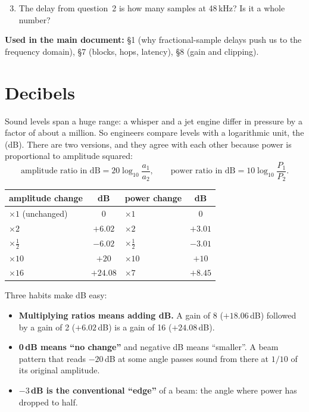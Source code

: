 \documentclass[11pt]{article}
\begin{document}
\begin{checkyourself}
\begin{enumerate}[nosep]
\setcounter{enumi}{2}
\item The delay from question~2 is how many samples at 48\,kHz? Is it a whole number?
\end{enumerate}
\end{checkyourself}

\begin{whereused}
\textbf{Used in the main document:} \S1 (why fractional-sample delays push us to the frequency
domain), \S7 (blocks, hops, latency), \S8 (gain and clipping).
\end{whereused}

\section{Decibels}\label{sec:db}

Sound levels span a huge range: a whisper and a jet engine differ in pressure by a factor of about
a million. So engineers compare levels with a logarithmic unit, the
 (dB). There are two versions, and they agree with each other because power is
proportional to amplitude squared:
\begin{equation}\label{eq:db}
  \text{amplitude ratio in dB}=20\log_{10}\frac{a_1}{a_2},\qquad
  \text{power ratio in dB}=10\log_{10}\frac{P_1}{P_2}.
\end{equation}

\begin{center}\small
\begin{tabular}{@{}lc@{\qquad}lc@{}}
\toprule
amplitude change & dB & power change & dB\\
\midrule
$\times1$ (unchanged) & $0$ & $\times1$ & $0$\\
$\times2$ & $+6.02$ & $\times2$ & $+3.01$\\
$\times\tfrac12$ & $-6.02$ & $\times\tfrac12$ & $-3.01$\\
$\times10$ & $+20$ & $\times10$ & $+10$\\
$\times16$ & $+24.08$ & $\times7$ & $+8.45$\\
\bottomrule
\end{tabular}
\end{center}

Three habits make dB easy:
\begin{itemize}[nosep]
\item \textbf{Multiplying ratios means adding dB.} A gain of 8 ($+18.06$\,dB) followed by a gain of
  2 ($+6.02$\,dB) is a gain of 16 ($+24.08$\,dB).
\item \textbf{0\,dB means ``no change''} and negative dB means ``smaller''. A beam pattern that reads
  $-20$\,dB at some angle passes sound from there at $1/10$ of its original amplitude.
\item \textbf{$-3$\,dB is the conventional ``edge''} of a beam: the angle where power has dropped to
  half.
\end{itemize}
\end{document}
